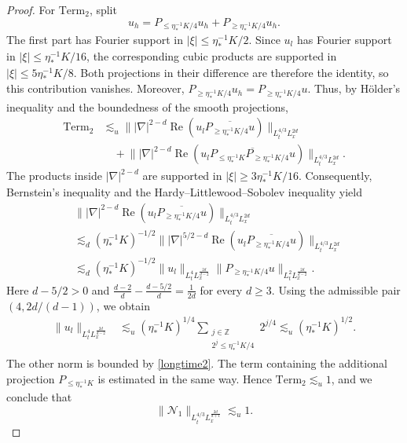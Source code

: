 \documentclass[reqno,11pt]{amsart}
\theoremstyle{plain}
\theoremstyle{definition}
\numberwithin{equation}{section}
\numberwithin{theorem}{section}
\def\geq{\geqslant}
\def\leq{\leqslant}
\begin{document}
\begin{proof}
For $\mathrm{Term}_2$, split
\[
 u_h=P_{\leq\eta_{\ast}^{-1}K/4}u_h
             +P_{\geq\eta_{\ast}^{-1}K/4}u_h.
\]
The first part has Fourier support in $|\xi|\leq\eta_{\ast}^{-1}K/2$.
Since $u_l$ has Fourier support in $|\xi|\leq\eta_{\ast}^{-1}K/16$,
the corresponding cubic products are supported in
$|\xi|\leq5\eta_{\ast}^{-1}K/8$. Both projections in their difference
are therefore the identity, so this contribution vanishes. Moreover,
$P_{\geq\eta_{\ast}^{-1}K/4}u_h=P_{\geq\eta_{\ast}^{-1}K/4}u$.
Thus, by H\"older's inequality and the boundedness of the smooth projections,
\begin{align*}
 \mathrm{Term}_2
 &\lesssim_u
 \big\||\nabla|^{2-d}\operatorname{Re}
       (u_l\overline{P_{\geq\eta_{\ast}^{-1}K/4}u})\big\|_
                                      {L_t^{4/3}L_x^{2d}}\\
 &\quad+
 \big\||\nabla|^{2-d}\operatorname{Re}
       (u_l\overline{P_{\leq\eta_{\ast}^{-1}K}
                          P_{\geq\eta_{\ast}^{-1}K/4}u})\big\|_
                                      {L_t^{4/3}L_x^{2d}}.
\end{align*}
The products inside $|\nabla|^{2-d}$ are supported in
$|\xi|\geq3\eta_{\ast}^{-1}K/16$. Consequently, Bernstein's inequality
and the Hardy--Littlewood--Sobolev inequality yield
\begin{align*}
 &\big\||\nabla|^{2-d}\operatorname{Re}
       (u_l\overline{P_{\geq\eta_{\ast}^{-1}K/4}u})\big\|_
                                      {L_t^{4/3}L_x^{2d}}\\
 &\lesssim_d(\eta_{\ast}^{-1}K)^{-1/2}
 \big\||\nabla|^{5/2-d}\operatorname{Re}
       (u_l\overline{P_{\geq\eta_{\ast}^{-1}K/4}u})\big\|_
                                      {L_t^{4/3}L_x^{2d}}\\
 &\lesssim_d(\eta_{\ast}^{-1}K)^{-1/2}
       \|u_l\|_{L_t^4L_x^{\frac{2d}{d-2}}}
       \|P_{\geq\eta_{\ast}^{-1}K/4}u\|_
                                      {L_t^2L_x^{\frac{2d}{d-2}}}.
\end{align*}
Here $d-5/2>0$ and
$\frac{d-2}{d}-\frac{d-5/2}{d}=\frac1{2d}$ for every $d\geq3$.
Using the admissible pair $(4,2d/(d-1))$, we obtain
\begin{align*}
 \|u_l\|_{L_t^4L_x^{\frac{2d}{d-2}}}
 &\lesssim_u(\eta_{\ast}^{-1}K)^{1/4}
       \sum_{\substack{j\in\mathbb Z\\2^j\leq\eta_{\ast}^{-1}K/4}}2^{j/4}
 \lesssim_u(\eta_{\ast}^{-1}K)^{1/2}.
\end{align*}
The other norm is bounded by \eqref{longtime2}. The term containing the
additional projection $P_{\leq\eta_{\ast}^{-1}K}$ is estimated in the same
way. Hence $\mathrm{Term}_2\lesssim_u1$, and we conclude that
\[
 \|\mathcal N_1\|_{L_t^{4/3}L_x^{\frac{2d}{d+1}}}\lesssim_u1.
\]


\end{proof}
\end{document}
